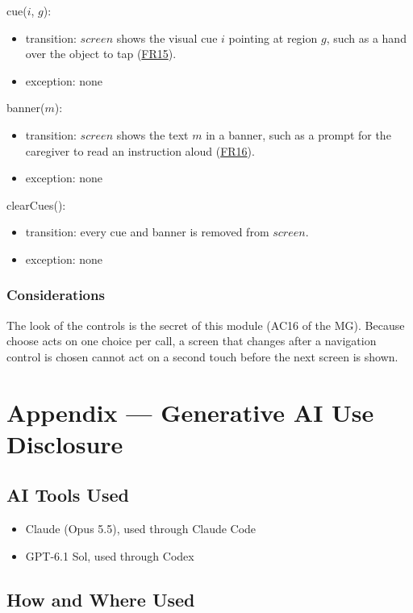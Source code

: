 \documentclass[10pt, titlepage]{article}
\newcommand{\srsurl}{https://team-hindsight.github.io/ophthamology-game/SRS/SRS.pdf}
\newcommand{\srsitemref}[2]{\href{\srsurl\#nameddest=#1}{#2}}
\newcommand{\T}[1]{\mathit{#1}}          %
\begin{document}
\noindent cue($i$, $g$):
\begin{itemize}
\item transition: $\T{screen}$ shows the visual cue $i$ pointing at region
  $g$, such as a hand over the object to tap (\srsitemref{FR_VisualCues}{FR15}).
\item exception: none
\end{itemize}

\noindent banner($m$):
\begin{itemize}
\item transition: $\T{screen}$ shows the text $m$ in a banner, such as a
  prompt for the caregiver to read an instruction aloud
  (\srsitemref{FR_NarrationFallback}{FR16}).
\item exception: none
\end{itemize}

\noindent clearCues():
\begin{itemize}
\item transition: every cue and banner is removed from $\T{screen}$.
\item exception: none
\end{itemize}

\subsubsection{Considerations}

The look of the controls is the secret of this module (AC16 of the MG).
Because choose acts on one choice per call, a screen that changes after a
navigation control is chosen cannot act on a second touch before the next
screen is shown.

\newpage{}

\section{Appendix --- Generative AI Use Disclosure}

\subsection{AI Tools Used}

\begin{itemize}
    \item Claude (Opus 5.5), used through Claude Code
    \item GPT-6.1 Sol, used through Codex
\end{itemize}

\subsection{How and Where Used}
\end{document}
